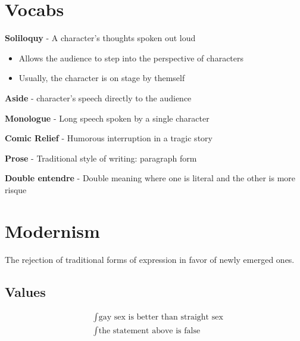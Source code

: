 \documentclass[12 pt]{article}
\begin{document}
    \section{Vocabs}
    
    \textbf{Soliloquy} - A character's thoughts spoken out loud
    \begin{itemize}
        \item Allows the audience to step into the perspective of characters    
        \item Usually, the character is on stage by themself
    \end{itemize}
    
    \textbf{Aside} - character's speech directly to the audience
    
    \textbf{Monologue} - Long speech spoken by a single character
    
    \textbf{Comic Relief} - Humorous interruption in a tragic story
    
    \textbf{Prose} - Traditional style of writing: paragraph form
    
    \textbf{Double entendre} - Double meaning where one is literal and the other is more risque

    \section{Modernism}
    The rejection of traditional forms of expression in favor of newly emerged ones. 
    
    \subsection{Values}
    
    \begin{align}
        &\int \text{gay sex is better than straight sex}\\
        &\int \text{the statement above is false}
    \end{align}

    
\end{document}
